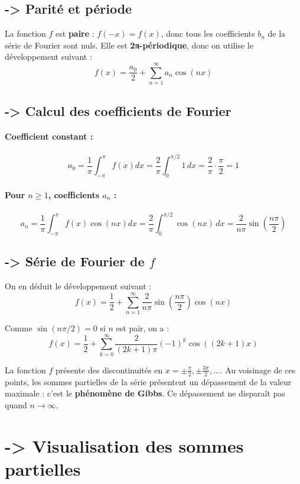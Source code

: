 \documentclass[11pt]{article} %
\begin{document}
\begin{large}
\subsection*{-> Parité et période}

La fonction \( f \) est \textbf{paire} : \( f(-x) = f(x) \), donc tous les coefficients \( b_n \) de la série de Fourier sont nuls.  
Elle est \textbf{2π-périodique}, donc on utilise le développement suivant :
\[
f(x) = \frac{a_0}{2} + \sum_{n=1}^\infty a_n \cos(nx)
\]

\subsection*{-> Calcul des coefficients de Fourier}

\paragraph{Coefficient constant :}
\[
a_0 = \frac{1}{\pi} \int_{-\pi}^{\pi} f(x) dx = \frac{2}{\pi} \int_0^{\pi/2} 1 \, dx = \frac{2}{\pi} \cdot \frac{\pi}{2} = 1
\]

\paragraph{Pour \( n \geq 1 \), coefficients \( a_n \) :}
\[
a_n = \frac{1}{\pi} \int_{-\pi}^{\pi} f(x)\cos(nx) dx = \frac{2}{\pi} \int_0^{\pi/2} \cos(nx)\, dx
= \frac{2}{n\pi} \sin\left( \frac{n\pi}{2} \right)
\]

\subsection*{-> Série de Fourier de \( f \)}

On en déduit le développement suivant :
\[
f(x) = \frac{1}{2} + \sum_{n=1}^\infty \frac{2}{n\pi} \sin\left( \frac{n\pi}{2} \right) \cos(nx)
\]

Comme \( \sin(n\pi/2) = 0 \) si \( n \) est pair, on a :
\[
f(x) = \frac{1}{2} + \sum_{k=0}^\infty \frac{2}{(2k+1)\pi} (-1)^k \cos((2k+1)x)
\]


La fonction \( f \) présente des discontinuités en \( x = \pm \frac{\pi}{2}, \pm \frac{3\pi}{2}, \dots \).  
Au voisinage de ces points, les sommes partielles de la série présentent un dépassement de la valeur maximale : c’est le \textbf{phénomène de Gibbs}. Ce dépassement ne disparaît pas quand \( n \to \infty \).


\section*{-> Visualisation des sommes partielles }


\end{large}
\end{document}
